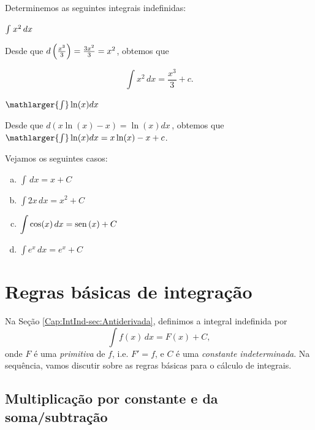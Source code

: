 \cleardoublepage\documentclass[../main.tex]{subfiles}
\begin{document}
\begin{ex}
Determinemos as seguintes integrais indefinidas:
\begin{compactenum}[a)]
\item \item \(\int_{}^{} x^2 \, dx\)

\begin{solution}
Desde que \(d\left(\frac{x^3}{3}\right)=\frac{3x^2}{3}=x^2\), obtemos que

\[ \int x^2\, dx=\dfrac{x^3}{3}+c. \]
\end{solution}
\item \(\mathlarger{\int} \ln (x) dx\)

\begin{solution}
Desde que \(d(x\ln( x) -x)=\ln (x) dx\,\), obtemos que \(\mathlarger{\int} \ln (x) dx=x\ln (x)-x +c\).
\end{solution}

\end{compactenum}
\end{ex}

\begin{ex}
  Vejamos os seguintes casos:
  \begin{multicols}{2}
  \begin{enumerate}[a)]
  \item $\displaystyle \int \,dx = x + C$
  \item $\displaystyle \int 2x\,dx = x^2 + C$
  \item $\displaystyle \int \cos(x)\,dx = \operatorname{sen}\,(x) + C$
  \item $\displaystyle \int e^x\,dx = e^x + C$
  \end{enumerate}
  \end{multicols}
\end{ex}

\section{Regras básicas de integração}\label{sec:RegrasIntegracao}

Na Seção \ref{Cap:IntInd-sec:Antiderivada}, definimos a integral indefinida por
\begin{equation}
  \int f(x)\,dx = F(x) + C,
\end{equation}
onde $F$ é uma \emph{primitiva} de $f$, i.e. $F' = f$, e $C$ é uma \emph{constante indeterminada}. Na sequência, vamos discutir sobre as regras básicas para o cálculo de integrais.


\subsection{Multiplicação por constante e da soma/subtração}\label{subsec:DemSomaSubtracao}
\end{document}
